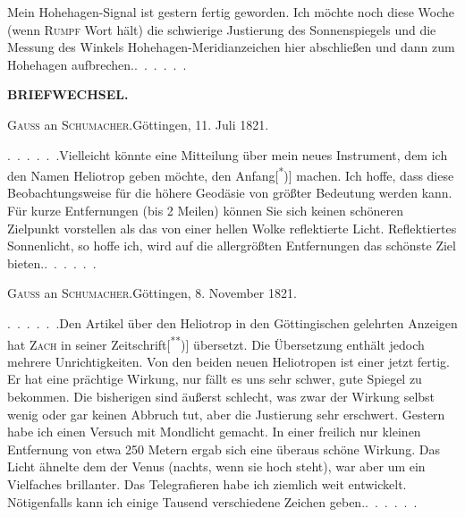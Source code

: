 \par\noindent\hspace*{\parindent}Mein Hohehagen-Signal ist gestern fertig geworden. Ich möchte noch diese Woche (wenn \textsc{Rumpf} Wort hält) die schwierige Justierung des Sonnenspiegels und die Messung des Winkels Hohehagen-Meridianzeichen hier abschließen und dann zum Hohehagen aufbrechen.\enspace .\ .\ .\ .\ .\ .

\par\clearpage
\noindent{}\hfill{\small\textbf{BRIEFWECHSEL.}}\hfill\null\par\bigskip
\begin{center}{\large\textsc{Gauss} an \textsc{Schumacher}.\quad Göttingen, 11. Juli 1821.}\end{center}
\par\noindent\hspace*{\parindent}.\ .\ .\ .\ .\ .\enspace Vielleicht könnte eine Mitteilung über mein neues Instrument, dem ich den Namen Heliotrop geben möchte, den Anfang[\textsuperscript{*})] machen. Ich hoffe, dass diese Beobachtungsweise für die höhere Geodäsie von größter Bedeutung werden kann. Für kurze Entfernungen (bis 2 Meilen) können Sie sich keinen schöneren Zielpunkt vorstellen als das von einer hellen Wolke reflektierte Licht. Reflektiertes Sonnenlicht, so hoffe ich, wird auf die allergrößten Entfernungen das schönste Ziel bieten.\enspace .\ .\ .\ .\ .\ .
\par\bigskip
\begin{center}{\large\textsc{Gauss} an \textsc{Schumacher}.\quad Göttingen, 8. November 1821.}\end{center}
\par\noindent\hspace*{\parindent}.\ .\ .\ .\ .\ .\enspace Den Artikel über den Heliotrop in den Göttingischen gelehrten Anzeigen hat \textsc{Zach} in seiner Zeitschrift[\textsuperscript{**})] übersetzt. Die Übersetzung enthält jedoch mehrere Unrichtigkeiten. Von den beiden neuen Heliotropen ist einer jetzt fertig. Er hat eine prächtige Wirkung, nur fällt es uns sehr schwer, gute Spiegel zu bekommen. Die bisherigen sind äußerst schlecht, was zwar der Wirkung selbst wenig oder gar keinen Abbruch tut, aber die Justierung sehr erschwert. Gestern habe ich einen Versuch mit Mondlicht gemacht. In einer freilich nur kleinen Entfernung von etwa 250 Metern ergab sich eine überaus schöne Wirkung. Das Licht ähnelte dem der Venus (nachts, wenn sie hoch steht), war aber um ein Vielfaches brillanter. Das Telegrafieren habe ich ziemlich weit entwickelt. Nötigenfalls kann ich einige Tausend verschiedene Zeichen geben.\enspace .\ .\ .\ .\ .\ .
